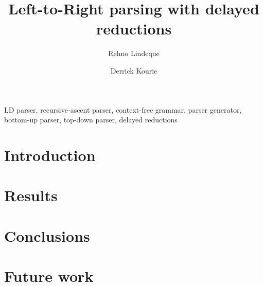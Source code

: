 \documentclass[envcountsame,runningheads]{llncs}
\begin{document}
\title{Left-to-Right parsing with delayed reductions}
\author{Rehno Lindeque \and Derrick Kourie}
\maketitle

\begin{abstract}
\end{abstract}

\begin{keywords}
LD parser, recursive-ascent parser, context-free grammar, parser generator, bottom-up parser, top-down parser, delayed reductions
\end{keywords}

\section{Introduction}


\section{Results}

\section{Conclusions}

\section{Future work}



\end{document}
